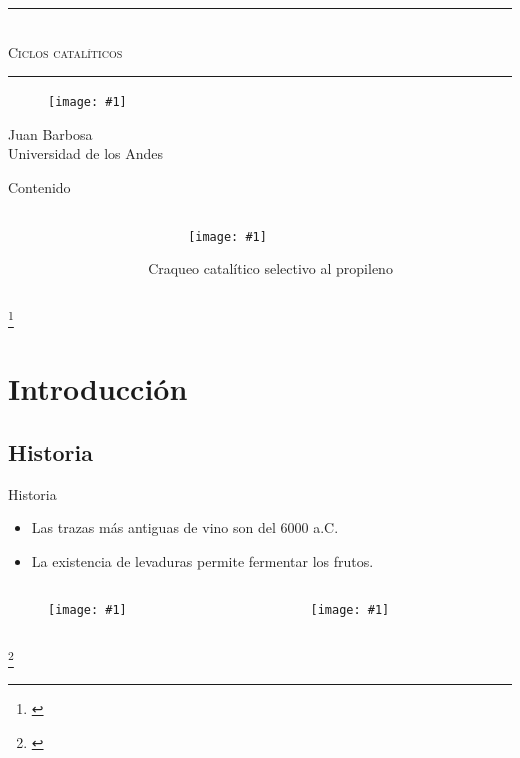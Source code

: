 \documentclass[handout]{beamer}
\newcommand\blfootnote[1]
{%
	\begingroup
	\renewcommand\thefootnote{}\footnote{#1}%
	\addtocounter{footnote}{-1}%
	\endgroup
}
\newcommand{\fcite}[1]{\blfootnote{\cite{#1}}}
\newcommand{\cfigure}[2]
{
	\begin{figure}
		\centering
		\texttt{[image: \#1]}
	\end{figure}
}
\begin{document}
{
	\begin{frame}
		\centering
		{
			\color{blue}
			\noindent\rule{6cm}{0.4pt}\\
			\textsc{\LARGE Ciclos catalíticos}\\
			\noindent\rule{6cm}{0.4pt}
		}
		\cfigure{sources/imagen_ciclo.png}{0.4\linewidth}
		\raggedleft
		{
			Juan Barbosa\\
			Universidad de los Andes
		}
	\end{frame}
}

\begin{frame}{Contenido}
	\begin{columns}
		\begin{column}{0.4\textwidth}
			\tableofcontents
		\end{column}
		\begin{column}{0.6\textwidth}
			\cfigure{sources/Market.jpg}{0.8\linewidth}
			\footnotesize Craqueo catalítico selectivo al propileno
		\end{column}
	\end{columns}
	\fcite{vogt2015fluid}
\end{frame}

\section{Introducción}

\subsection{Historia}
\begin{frame}{Historia}
	\begin{itemize}
		\item Las trazas más antiguas de vino son del 6000 a.C.
		\item La existencia de levaduras permite fermentar los frutos.
	\end{itemize}
	\begin{columns}
		\begin{column}{0.4\textwidth}
			\cfigure{sources/wine.jpg}{\textwidth}
		\end{column}
		\begin{column}{0.6\textwidth}
			\cfigure{sources/sugar.png}{\linewidth}
		\end{column}
	\end{columns}
	\fcite{mcgovern2003origins}
\end{frame}
\end{document}
